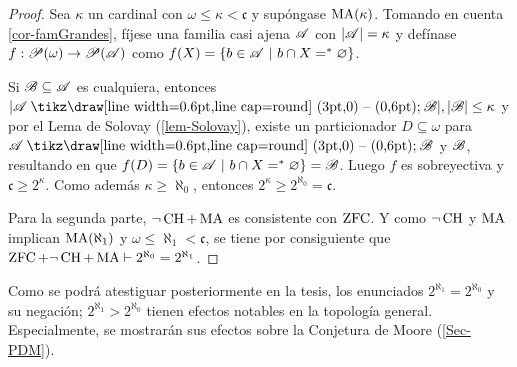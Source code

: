  \begin{proof}
  Sea $\kappa$ un cardinal con $\omega \leq \kappa <\mathfrak{c}$ y supóngase $\operatorname{MA}(\kappa)$. Tomando en cuenta \ref{cor-famGrandes}, fíjese una familia casi ajena $\mathscr{A}$ con $|\mathscr{A}|=\kappa$ y defínase $f:\mathscr{P}(\omega) \to \mathscr{P}(\mathscr{A})$ como $ f(X)=\{ b \in \mathscr{A} \text{ $|$ } b \cap X =^* \varnothing \} $.

  Si $\mathscr{B} \subseteq \mathscr{A}$ es cualquiera, entonces $|\ms{A} \setminus \ms{B}|, |\ms{B}| \leq \kappa$ y por el Lema de Solovay (\ref{lem-Solovay}), existe un particionador $D \subseteq \omega$ para $\ms{A} \setminus \ms{B}$ y $\mathscr{B}$, resultando en que $ f(D)=\{b \in \mathscr{A} \text{ $|$ } b \cap X =^* \varnothing \} = \mathscr{B} $. Luego $f$ es sobreyectiva y $\mathfrak{c} \geq 2^\kappa $. Como además $\kappa \geq \aleph_0$, entonces $2^\kappa \geq 2^{\aleph_0}=\mathfrak{c}$.

  Para la segunda parte, $\lnot \operatorname{CH} + \operatorname{MA}$ es consistente con $\operatorname{ZFC}$. Y como $\lnot \operatorname{CH}$ y $\operatorname{MA}$ implican $\operatorname{MA}(\aleph_1)$ y $\omega \leq \aleph_1 < \mathfrak{c}$, se tiene por consiguiente que $\operatorname{ZFC}+\lnot \operatorname{CH} + \operatorname{MA} \vdash 2^{\aleph_0}=2^{\aleph_1}$.
 \end{proof}

 Como se podrá atestiguar posteriormente en la tesis, los enunciados $2^{\aleph_1} = 2^{\aleph_0}$ y su negación; $2^{\aleph_1} > 2^{\aleph_0}$ tienen efectos notables en la topología general. Especialmente, se mostrarán sus efectos sobre la Conjetura de Moore (\autoref{Sec-PDM}).
